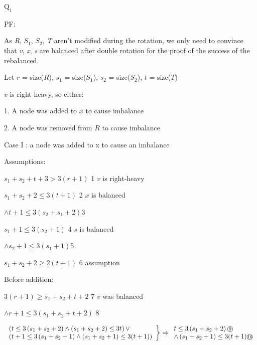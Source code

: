 \documentclass[12pt]{article}
\begin{document}
$\text{Q}_{1}$

PF:

As \textit{R}, \textit{$S_1$}, \textit{$S_2$}, \textit{T} aren't modified during the rotation, we only need to convince that \textit{v}, \textit{x}, \textit{s} are balanced after double rotation for the proof of the success of the rebalanced.

Let $r$ = size($R$), $s_1$ = size($S_1$), $s_2$ = size($S_2$), $t$ = size($T$)

$v$ is right-heavy, so either:

1. A node was added to $x$ to cause imbalance

2. A node was removed from $R$ to cause imbalance

Case I : a node was added to x to cause an imbalance

Assumptions:

$s_{1}+s_{2}+t+3>3(r+1) $   {\small\textcircled{\scriptsize{1}}}  
  $v$ is right-heavy 

$s_{1}+s_{2}+2 \leq 3(t+1) $   {\small\textcircled{\scriptsize{2}}} 
  $ x $ is balanced 
  
$\wedge t+1 \leq 3\left(s_{2}+s_{1}+2\right)${\small\textcircled{\scriptsize{3}}}

$s_{1}+1 \leq 3\left(s_{2}+1\right) $   {\small\textcircled{\scriptsize{4}}} 
  $ s$ is balanced 
  
$\wedge s_{2}+1 \leq 3\left(s_{1}+1\right)${\small\textcircled{\scriptsize{5}}}

$s_{1}+s_{2}+2 \geqslant 2(t+1)$   {\small\textcircled{\scriptsize{6}}} 
   assumption 
   

Before addition:


$3(r+1) \geq s_{1}+s_{2}+t+2$ {\small\textcircled{\scriptsize{7}}} $v$ was balanced

$\wedge r+1 \leq 3\left(s_{1}+s_{2}+t+2\right)$ {\small\textcircled{\scriptsize{8}}}

$\left.\begin{array}{l}
\left(t \leq 3\left(s_{1}+s_{2}+2\right)\wedge\left(s_{1}+s_{2}+2\right) \leq 3 t\right) \lor\\
\left(t+1 \leq 3\left(s_{1}+s_{2}+1\right)\wedge\left(s_{1}+s_{2}+1\right) \leq 3(t+1)\right)
\end{array}\right\} \Rightarrow \begin{array}{l}
t \leq 3\left(s_{1}+s_{2}+2\right)\text{\small\textcircled{\scriptsize{9}}} \\
\wedge\left(s_{1}+s_{2}+1\right) \leq 3(t+1)\text{\small\textcircled{\scriptsize{10}}}\end{array}$
\end{document}
